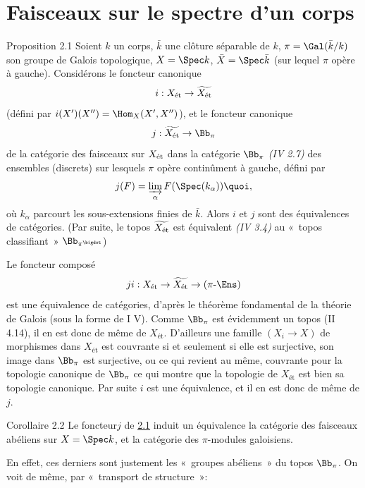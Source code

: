 \documentclass[10pt]{../fichiers-configuration-latex/smfart}
\begin{document}
\section{Faisceaux sur le spectre d'un corps}\pageoriginale

\begin{enonce*}{Proposition 2.1}
Soient $k$ un corps, $\bar{k}$ une clôture séparable
de $k$, $\pi = \Gal (\bar{k}/k)$ son groupe de Galois topologique,
$X = \Spec k$, $\bar{X} = \Spec \bar{k}$ (sur lequel $\pi$ opère à
gauche). Considérons le foncteur canonique
$$
i : X_{\text{\rm ét}} \to \widetilde{X_{\text{\rm ét}}}
$$
(défini par $i(X')(X'') = \Hom_X (X', X'')$), et le foncteur canonique
$$
j : \widetilde{X_{\text{\rm ét}}} \to \Bb_{\pi}
$$
de la catégorie des faisceaux sur $X_{\text{\rm ét}}$ dans la catégorie
$\Bb_{\pi}$ \emph{(\cf IV 2.7)} des ensembles (discrets) sur lesquels
$\pi$ opère continûment à gauche, défini par
$$
j(F) = \varinjlim_{\alpha} F(\Spec(k_{\alpha})){\quoi},
$$
où $k_{\alpha}$ parcourt les sous-extensions finies de
$\bar{k}$. Alors $i$ et $j$ sont des équivalences de catégories. (Par
suite, le topos $\widetilde{X_{\text{\rm ét}}}$ est équivalent
\emph{(IV 3.4)} au
« topos classifiant » $\Bb_{\pi^{\bigdot}}$)
\end{enonce*}

Le foncteur composé
$$
ji : X_{\text{\rm ét}} \to \widetilde{X_{\text{ét}}} \to (\pi\text{-}\Ens)
$$
est une équivalence de catégories, d'après le théorème fondamental
de la théorie de Galois (sous la forme de \SGA I V). Comme
$\Bb_{\pi}$ est évidemment un topos (II 4.14), il en est donc de
même de $X_{\text{ét}}$. D'ailleurs une famille $(X_i \to X)$ de
morphismes dans $X_{\text{ét}}$ est couvrante si et seulement si
elle est surjective, \ie son image dans $\Bb_{\pi}$ est surjective,
ou ce qui revient au même, couvrante pour la topologie canonique de
$\Bb_{\pi}$ ce qui montre que la topologie de $X_{\text{ét}}$ est
bien sa topologie canonique. Par suite $i$ est une équivalence, et
il en est donc de même de $j$.

\begin{enonce*}{Corollaire 2.2}
Le foncteur\pageoriginale  $j$ de \hyperref[VIII.prop2.1]{2.1} induit un
équivalence  la catégorie des
faisceaux abéliens sur $X = \Spec k$, et la catégorie des
$\pi$-modules galoisiens.
\end{enonce*}

En effet, ces derniers sont justement les « groupes abéliens »
du topos $\Bb_{\pi}$. On voit de même, par « transport de
structure »:
\end{document}
